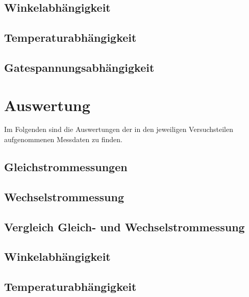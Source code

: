 \documentclass[12pt,a4paper]{article}
\begin{document}
	\subsection{Winkelabhängigkeit}
	\label{ch:winkel}
	
	\clearpage
	\subsection{Temperaturabhängigkeit}
	\label{ch:temp}
	
	\clearpage
	\subsection{Gatespannungsabhängigkeit}
	\label{ch:gate}
	
	
	\newpage
	\clearpage
	
	\section{Auswertung}
	\label{chap:auswertung}
	
	Im Folgenden sind die Auswertungen der in den jeweiligen Versuchsteilen aufgenommenen Messdaten zu finden. 
	
	\subsection{Gleichstrommessungen}
	\label{ch:ausw_dc}
	
	\clearpage
	\subsection{Wechselstrommessung}
	\label{ch:ausw_ac}
	
	\clearpage
	\subsection{Vergleich Gleich- und Wechselstrommessung}
	\label{ch:vgl_ac_dc}
	
	\clearpage
	\subsection{Winkelabhängigkeit}
	\label{ch:ausw_winkel}
	
	\clearpage
	\subsection{Temperaturabhängigkeit}
	\label{ch:ausw_temp}
	
	\clearpage
\end{document}
